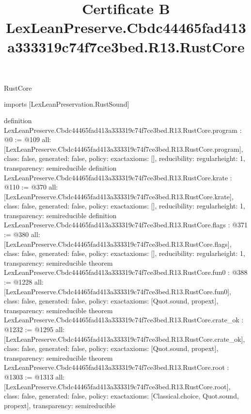 \begin{lexlean}{RustCore}
\title{Certificate B LexLeanPreserve.Cbdc44465fad413a333319c74f7ce3bed.R13.RustCore}
\begin{coremodule}
imports [LexLeanPreservation.RustSound]

definition LexLeanPreserve.Cbdc44465fad413a333319c74f7ce3bed.R13.RustCore.program : @0 := @109 {
  all: [LexLeanPreserve.Cbdc44465fad413a333319c74f7ce3bed.R13.RustCore.program],
  class: false,
  generated: false,
  policy: exact{axioms: []},
  reducibility: regular{height: 1},
  transparency: semireducible
}
definition LexLeanPreserve.Cbdc44465fad413a333319c74f7ce3bed.R13.RustCore.krate : @110 := @370 {
  all: [LexLeanPreserve.Cbdc44465fad413a333319c74f7ce3bed.R13.RustCore.krate],
  class: false,
  generated: false,
  policy: exact{axioms: []},
  reducibility: regular{height: 1},
  transparency: semireducible
}
definition LexLeanPreserve.Cbdc44465fad413a333319c74f7ce3bed.R13.RustCore.flags : @371 := @380 {
  all: [LexLeanPreserve.Cbdc44465fad413a333319c74f7ce3bed.R13.RustCore.flags],
  class: false,
  generated: false,
  policy: exact{axioms: []},
  reducibility: regular{height: 1},
  transparency: semireducible
}
theorem LexLeanPreserve.Cbdc44465fad413a333319c74f7ce3bed.R13.RustCore.fun0 : @388 := @1228 {
  all: [LexLeanPreserve.Cbdc44465fad413a333319c74f7ce3bed.R13.RustCore.fun0],
  class: false,
  generated: false,
  policy: exact{axioms: [Quot.sound, propext]},
  transparency: semireducible
}
theorem LexLeanPreserve.Cbdc44465fad413a333319c74f7ce3bed.R13.RustCore.crate_ok : @1232 := @1295 {
  all: [LexLeanPreserve.Cbdc44465fad413a333319c74f7ce3bed.R13.RustCore.crate_ok],
  class: false,
  generated: false,
  policy: exact{axioms: [Quot.sound, propext]},
  transparency: semireducible
}
theorem LexLeanPreserve.Cbdc44465fad413a333319c74f7ce3bed.R13.RustCore.root : @1303 := @1313 {
  all: [LexLeanPreserve.Cbdc44465fad413a333319c74f7ce3bed.R13.RustCore.root],
  class: false,
  generated: false,
  policy: exact{axioms: [Classical.choice, Quot.sound, propext]},
  transparency: semireducible
}


\end{coremodule}
\end{lexlean}
